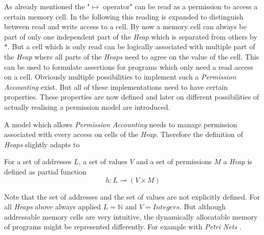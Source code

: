 	As already mentioned the "$\mapsto$ operator" can be read as a permission to
	access a certain memory cell. In the following this reading is expanded to
	distinguish between read and write access to a cell. By now a memory cell can always
	be part of only one independent part of the \emph{Heap} which is separated
	from others by $\ast$. But a cell which is only read can be logically
	associated with multiple part of the \emph{Heap} where all parts of the 
	\emph{Heaps} need to agree on the value of the cell. This can be used to
	formulate assertions for programs which only need a read access on a
	cell. Obviously multiple possibilities to implement such a
	\emph{Permission Accounting} exist. But all of these implementations need to
	have certain properties. These properties are now defined and later on
	different possibilities of actually realising a permission model are
	introduced.

	A model which allows \emph{Permission Accounting} needs to manage permission
	associated with every access on cells of the \emph{Heap}. Therefore the
	definition of \emph{Heaps} slightly adapts to
	\begin{mydef}[Heap]
		For a set of addresses $L$, a set of values $V$ and a set of
		permissions $M$ a \emph{Heap} is defined as partial function
		$$h: L \rightharpoonup (V\times M)$$
	\end{mydef}
	\noindent
	Note that the set of addresses and the set of values are not explicitly
	defined. For all \emph{Heaps} above always applied $L = \mathbb{N}$ and
	$V = \textit{Integers}$. But although addressable memory cells are very
	intuitive, the dynamically allocatable memory of programs might be
	represented differently. For example with \emph{Petri Nets} \cite{seplogproof}.

